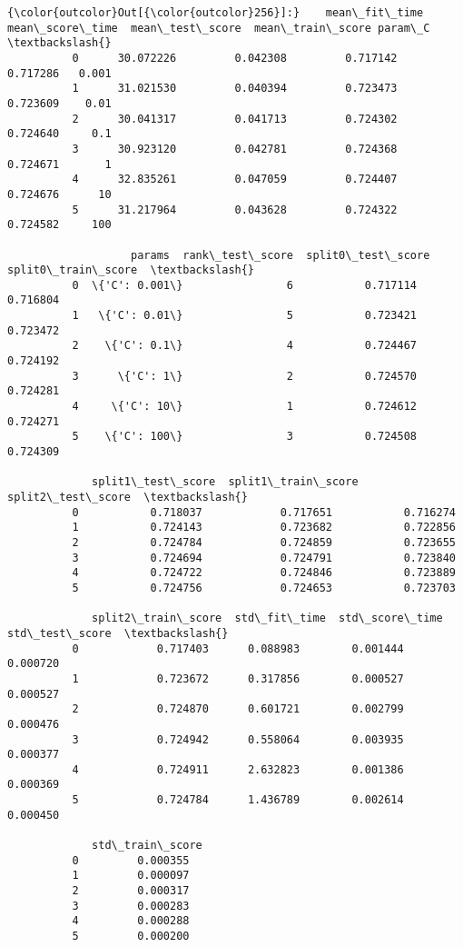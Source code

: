 \documentclass[11pt]{article}
\begin{document}
            \begin{Verbatim}[commandchars=\\\{\}]
{\color{outcolor}Out[{\color{outcolor}256}]:}    mean\_fit\_time  mean\_score\_time  mean\_test\_score  mean\_train\_score param\_C  \textbackslash{}
          0      30.072226         0.042308         0.717142          0.717286   0.001   
          1      31.021530         0.040394         0.723473          0.723609    0.01   
          2      30.041317         0.041713         0.724302          0.724640     0.1   
          3      30.923120         0.042781         0.724368          0.724671       1   
          4      32.835261         0.047059         0.724407          0.724676      10   
          5      31.217964         0.043628         0.724322          0.724582     100   
          
                   params  rank\_test\_score  split0\_test\_score  split0\_train\_score  \textbackslash{}
          0  \{'C': 0.001\}                6           0.717114            0.716804   
          1   \{'C': 0.01\}                5           0.723421            0.723472   
          2    \{'C': 0.1\}                4           0.724467            0.724192   
          3      \{'C': 1\}                2           0.724570            0.724281   
          4     \{'C': 10\}                1           0.724612            0.724271   
          5    \{'C': 100\}                3           0.724508            0.724309   
          
             split1\_test\_score  split1\_train\_score  split2\_test\_score  \textbackslash{}
          0           0.718037            0.717651           0.716274   
          1           0.724143            0.723682           0.722856   
          2           0.724784            0.724859           0.723655   
          3           0.724694            0.724791           0.723840   
          4           0.724722            0.724846           0.723889   
          5           0.724756            0.724653           0.723703   
          
             split2\_train\_score  std\_fit\_time  std\_score\_time  std\_test\_score  \textbackslash{}
          0            0.717403      0.088983        0.001444        0.000720   
          1            0.723672      0.317856        0.000527        0.000527   
          2            0.724870      0.601721        0.002799        0.000476   
          3            0.724942      0.558064        0.003935        0.000377   
          4            0.724911      2.632823        0.001386        0.000369   
          5            0.724784      1.436789        0.002614        0.000450   
          
             std\_train\_score  
          0         0.000355  
          1         0.000097  
          2         0.000317  
          3         0.000283  
          4         0.000288  
          5         0.000200  
\end{Verbatim}
        
\end{document}
